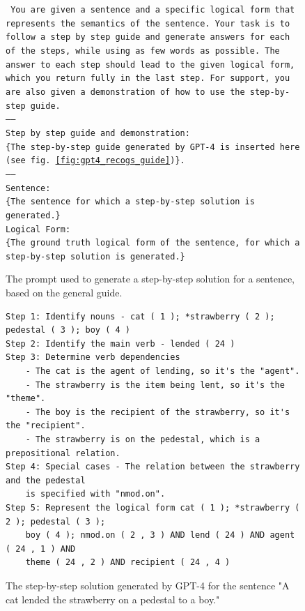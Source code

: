 \documentclass[11pt]{article}
\begin{document}
    \begin{figure}
        \small
        \texttt{
            You are given a sentence and a specific logical form that represents the semantics of the sentence.
            Your task is to follow a step by step guide and generate answers for each of the steps,
            while using as few words as possible.
            The answer to each step should lead to the given logical form, which you return fully in the last step.
            For support, you are also given a demonstration of how to use the step-by-step guide.\\
            -----\\
            Step by step guide and demonstration:\\
            {\color{red}\{The step-by-step guide generated by GPT-4 is inserted here (see fig. \ref{fig:gpt4_recogs_guide})\}.}\\
            -----\\
            Sentence:\\
            {\color{red}\{The sentence for which a step-by-step solution is generated.\}}\\
            Logical Form:\\
            {\color{red}\{The ground truth logical form of the sentence, for which a step-by-step solution is generated.\}}
        }
        \caption{The prompt used to generate a step-by-step solution for a sentence, based on the general guide.}
        \label{fig:prompt_generate_cot_solution}
    \end{figure}

    \begin{figure}
        \small
        \begin{verbatim}
Step 1: Identify nouns - cat ( 1 ); *strawberry ( 2 ); pedestal ( 3 ); boy ( 4 )
Step 2: Identify the main verb - lended ( 24 )
Step 3: Determine verb dependencies
    - The cat is the agent of lending, so it's the "agent".
    - The strawberry is the item being lent, so it's the "theme".
    - The boy is the recipient of the strawberry, so it's the "recipient".
    - The strawberry is on the pedestal, which is a prepositional relation.
Step 4: Special cases - The relation between the strawberry and the pedestal
    is specified with "nmod.on".
Step 5: Represent the logical form cat ( 1 ); *strawberry ( 2 ); pedestal ( 3 );
    boy ( 4 ); nmod.on ( 2 , 3 ) AND lend ( 24 ) AND agent ( 24 , 1 ) AND
    theme ( 24 , 2 ) AND recipient ( 24 , 4 )
        \end{verbatim}
        \caption{The step-by-step solution generated by GPT-4 for the sentence
        "A cat lended the strawberry on a pedestal to a boy."}
        \label{fig:gpt4_cot_solution_example}
    \end{figure}
\end{document}

